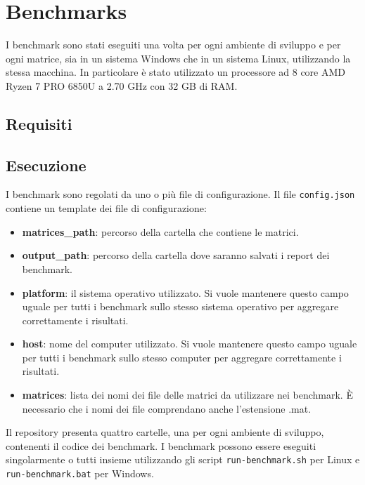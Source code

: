 \documentclass[a4paper, 12pt]{article}
\begin{document}
    \section{Benchmarks}
        I benchmark sono stati eseguiti una volta per ogni ambiente di sviluppo e per ogni matrice, sia in un sistema
        Windows che in un sistema Linux, utilizzando la stessa macchina.
        In particolare è stato utilizzato un processore ad 8 core AMD Ryzen 7 PRO 6850U a 2.70 GHz con 32 GB di RAM.

        \subsection{Requisiti}
            

        \subsection{Esecuzione}
            I benchmark sono regolati da uno o più file di configurazione. 
            Il file \texttt{config.json} contiene un template dei file di 
            configurazione:
            \begin{itemize}
                \item \textbf{matrices\_path}: percorso della cartella che 
                contiene le matrici.
                \item \textbf{output\_path}: percorso della cartella dove 
                saranno salvati i report dei benchmark.
                \item \textbf{platform}: il sistema operativo utilizzato.
                Si vuole mantenere questo campo uguale per tutti i benchmark
                sullo stesso sistema operativo per aggregare correttamente i
                risultati.
                \item \textbf{host}: nome del computer utilizzato.
                Si vuole mantenere questo campo uguale per tutti i benchmark
                sullo stesso computer per aggregare correttamente i
                risultati.
                \item \textbf{matrices}: lista dei nomi dei file delle matrici 
                da utilizzare nei benchmark. \`E necessario che i nomi dei file
                comprendano anche l'estensione .mat.
            \end{itemize}

            Il repository presenta quattro cartelle, una per ogni ambiente di
            sviluppo, contenenti il codice dei benchmark. I benchmark possono 
            essere eseguiti singolarmente o tutti insieme utilizzando gli script
            \texttt{run-benchmark.sh} per Linux e \texttt{run-benchmark.bat} per
            Windows.
            
\end{document}
